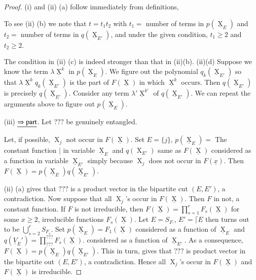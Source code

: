\documentclass[a4paper,12pt]{article}
\DeclareMathOperator{\x}{\mathrm{X}}
\theoremstyle{definition}
\theoremstyle{underlinethm}
\theoremstyle{underline}
\begin{document}
 \begin{proof}
  (i) and (ii) (a) follow immediately from definitions,
  
  To see (ii) (b) we note that $t = t_{1} t_{2}$ with $t_{1} =$ number of terms in $p (\underline{\x}_{E})$ and $t_{2}=$ number of terms in $q(\underline{\x}_{E'})$, and under the given condition, $t_{1} \geq 2$ and $t_{2} \geq 2$.
  
  The condition in (ii) (c) is indeed stronger than that in (ii)(b). (ii)(d) Suppose we know the term $\lambda\underline{\x}^{k}$ in $p(\underline{\x}_{E})$. We figure out the polynomial $q_{k}(\underline{\x}_{E'})$ so that $\lambda \underline{\x}^{k} q_{k}(\underline{\x}_{E'})$ is the part of $F(\underline{\x})$ in which $\underline{\x}^{k}$ occurs. Then $q(\underline{\x}_{E'})$ is precisely $q(\underline{\x}_{E'})$. Consider any term $\lambda'\underline{\x}^{k'}$ of $q(\underline{\x}_{E'})$. We can repeat the arguments above to figure out $p(\underline{\x}_{E})$.
  
  (iii) $\underline{\Rightarrow {\rm part}}$. Let $???$ be genuinely entangled. 
  
  Let, if possible, $\x_{j}$ not occur in $F(\underline{\x})$. Set $E=\{j\}$, $p(\underline{\x}_{E})=$ The constant function $|$ in variable $\underline{\x}_{E}$ and $q(\x_{E'})$ same as $F(\underline{\x})$ considered as a function in variable $\underline{\x}_{E'}$ simply because $\x_{j}$ does not occur in $F(\underline{x})$. Then $F(\underline{\x}) = p(\underline{\x}_{E}) q (\underline{\x}_{E'})$. 
  
  (ii) (a) gives that  $???$ is a product vector in the bipartite cut $(E, E')$, a contradiction. Now suppose that all $\x_{j}$'s occur in $F(\underline{\x})$. Then $F$ in not, a constant function. If $F$ is not irreducible, then $F(\underline{\x}) = \prod\limits_{s=1}^{r} F_{s}(\underline{\x})$ for some $x \geq 2$, irreducible functions $F_{s}(\underline{\x})$. Let $E= S_{F_{'}}$, $E' = \lceil E$ then turns out to be $\bigcup\limits_{s=2}^{r} S_{F_{s}}$. Set $p(\underline{\x}_{E}) = F_{1}(\underline{\x})$ considered as a function of $\underline{\x}_{E}$ and $q(\underline{V}_{E}') = \prod\limits_{???}^{???} F_{s}(\underline{\x})$. considered as a function of $\underline{\x}_{E'}$. As a consequence, $F(\underline{\x}) = p (\underline{\x}_{E}) q (\underline{\x}_{E'})$. This in turn, gives that $???$ is product vector in the bipartite out $(E, E')$, a contradiction. Hence all $\x_{j}$'s occur in $F(\underline{\x})$ and $F(\underline{\x})$ is irreducible.
  

\end{proof}
\end{document}
